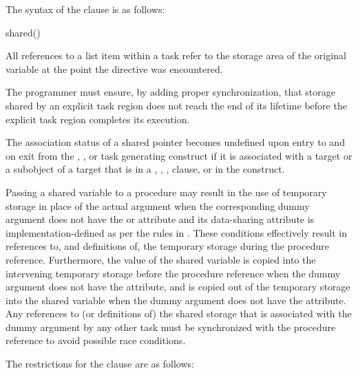 \syntax
The syntax of the  clause is as follows:

\begin{ompSyntax}
shared()
\end{ompSyntax}

\descr
All references to a list item within a task refer to the storage area of the 
original variable at the point the directive was encountered.

The programmer must ensure, by adding proper synchronization, that storage 
shared by an explicit task region does not reach the end of its lifetime before
the explicit task region completes its execution.


\begin{fortranspecific}
The association status of a shared pointer becomes undefined upon entry to and 
on exit from the , , or task generating construct if 
it is associated with a target or a  subobject of a target that is in a ,
, ,  clause, 
 or  in the construct.


\begin{note}
Passing a shared variable to a procedure may result in the use of temporary 
storage in place of the actual argument when the corresponding dummy argument 
does not have the  or  attribute and its 
data-sharing attribute is implementation-defined as per the rules in
.
These conditions effectively result in references to, and definitions of, the
temporary storage during the procedure reference.  Furthermore, the value of
the shared variable is copied into the intervening temporary storage before 
the procedure reference when the dummy argument does not have the 
attribute, and is copied out of the temporary storage into the shared variable when
the dummy argument does not have the  attribute.  Any
references to (or definitions of) the shared storage that is associated with
the dummy argument by any other task must be synchronized with
the procedure reference to avoid possible race conditions.
\end{note}
\end{fortranspecific}

\restrictions
The restrictions for the  clause are as follows:


